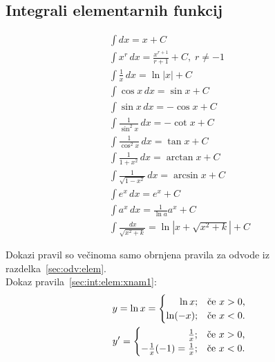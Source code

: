 \documentclass[a4paper,oneside,12pt,fleqn]{article}
\def\kos{\cos}
\renewcommand{\d}{\ensuremath{\,d}} %
\newcommand{\dx}{\ensuremath{\d x}}
\numberwithin{equation}{section}
\begin{document}
\subsection{Integrali elementarnih funkcij}
\label{sec:int:elem}
\begin{gather}
  \int\!\!dx = x + C \label{sec:int:elem:1} \\
  \int\!x^r\dx = \frac{x^{r+1}}{r+1} + C, \; r \neq -1 \label{sec:int:elem:xnan} \\
  \int\!\frac{1}{x}\dx = \ln|x| + C \label{sec:int:elem:xnam1} \\
  \int\!\kos x\dx = \sin x + C \label{sec:int:elem:cos} \\
  \int\!\sin x\dx = -\kos x + C \label{sec:int:elem:sin} \\
  \int\!\frac{1}{\sin^2x}\dx = -\cot x + C \label{sec:int:elem:1zsin2} \\
  \int\!\frac{1}{\kos^2x}\dx = \tan x + C \label{sec:int:elem:1zcos2} \\
  \int\!\frac{1}{1+x^2}\dx = \arctan x + C \label{sec:int:elem:1z1x2} \\
  \int\!\frac{1}{\sqrt{1-x^2}}\dx = \arcsin x + C \label{sec:int:elem:1zkor1mx2} \\
  \int\!e^x\dx = e^x + C \label{sec:int:elem:ex} \\
  \int\!a^x\dx = \frac{1}{\ln a}a^x + C \label{sec:int:elem:ax} \\
  \int\!\frac{\dx}{\sqrt{x^2+k}} = \ln|x+\sqrt{x^2+k}| + C \label{sec:int:elem:dolga}
\end{gather}

Dokazi pravil so večinoma samo obrnjena pravila za odvode iz
razdelka~\ref{sec:odv:elem}. \\
Dokaz pravila~\eqref{sec:int:elem:xnam1}:
\begin{gather*}
  y = \ln x = 
  \begin{cases}
    \hfill    \ln x; & \text{če $x > 0$,} \\
    \hfill \ln (-x); & \text{če $x < 0$.}
  \end{cases} \\
  y' = 
  \begin{cases}
    \hfill \frac{1}{x}; & \text{če $x > 0$,} \\
    \hfill -\frac{1}{x}(-1) = \frac{1}{x}; & \text{če $x < 0$.}
  \end{cases}
\end{gather*}
\end{document}
